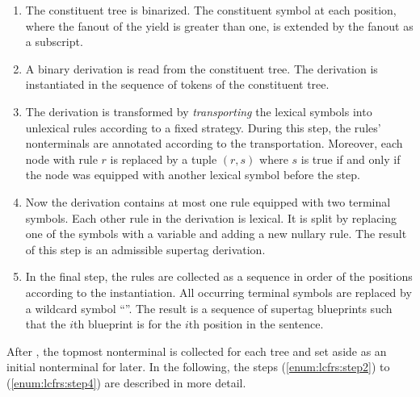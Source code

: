 \documentclass[../../document.tex]{subfiles}
\begin{document}
    \begin{enumerate}
        \item\label{enum:lcfrs:step1}
            The constituent tree is binarized.
            The constituent symbol at each position, where the fanout of the yield is greater than one, is extended by the fanout as a subscript.
        \item\label{enum:lcfrs:step2}
            A binary  derivation is read from the constituent tree.
            The derivation is instantiated in the sequence of tokens of the constituent tree.
        \item\label{enum:lcfrs:step3}
            The derivation is transformed by \emph{transporting} the lexical symbols into unlexical rules according to a fixed strategy.
            During this step, the rules' nonterminals are annotated according to the transportation.
            Moreover, each node with rule \(r\) is replaced by a tuple \((r, s)\) where \(s\) is true if and only if the node was equipped with another lexical symbol before the step.
        \item\label{enum:lcfrs:step4}
            Now the derivation contains at most one rule equipped with two terminal symbols. Each other rule in the derivation is lexical.
            It is split by replacing one of the symbols with a variable and adding a new nullary rule.
            The result of this step is an admissible  supertag derivation.
        \item
            In the final step, the rules are collected as a sequence in order of the positions according to the instantiation.
            All occurring terminal symbols are replaced by a wildcard symbol ``\wildcard{}''.
            The result is a sequence of  supertag blueprints such that the \(i\)th blueprint is for the \(i\)th position in the sentence.
    \end{enumerate}
    After , the topmost  nonterminal is collected for each tree and set aside as an initial nonterminal for later.
    In the following, the steps (\ref{enum:lcfrs:step2}) to (\ref{enum:lcfrs:step4}) are described in more detail.
\end{document}
